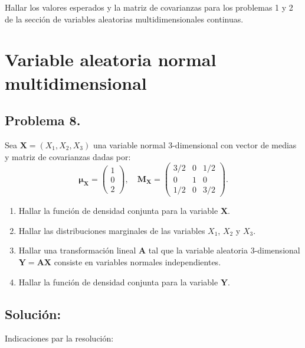 \documentclass[
]{article}
\providecommand{\tightlist}{%
  \setlength{\itemsep}{0pt}\setlength{\parskip}{0pt}}
\begin{document}
Hallar los valores esperados y la matriz de covarianzas para los
problemas 1 y 2 de la sección de variables aleatorias multidimensionales
continuas.

\hypertarget{variable-aleatoria-normal-multidimensional}{%
\section{Variable aleatoria normal
multidimensional}\label{variable-aleatoria-normal-multidimensional}}

\hypertarget{problema-8.}{%
\subsection{Problema 8.}\label{problema-8.}}

Sea \(\mathbf{X}=(X_1,X_2,X_3)\) una variable normal \(3\)-dimensional
con vector de medias y matriz de covarianzas dadas por: \[
\mathbf{\mu}_{\mathbf{X}} =\begin{pmatrix}1\\0\\2\end{pmatrix},\quad \mathbf{M}_{\mathbf{X}} =\begin{pmatrix}3/2 & 0 & 1/2 \\ 0 & 1 & 0 \\ 1/2 & 0 & 3/2\end{pmatrix}.
\]

\begin{enumerate}
\def\labelenumi{\arabic{enumi}.}
\tightlist
\item
  Hallar la función de densidad conjunta para la variable
  \(\mathbf{X}\).
\item
  Hallar las distribuciones marginales de las variables \(X_1\), \(X_2\)
  y \(X_3\).
\item
  Hallar una transformación lineal \(\mathbf{A}\) tal que la variable
  aleatoria \(3\)-dimensional \(\mathbf{Y}=\mathbf{A}\mathbf{X}\)
  consiste en variables normales independientes.
\item
  Hallar la función de densidad conjunta para la variable
  \(\mathbf{Y}\).
\end{enumerate}

\hypertarget{soluciuxf3n-5}{%
\subsection{Solución:}\label{soluciuxf3n-5}}

Indicaciones par la resolución:
\end{document}
